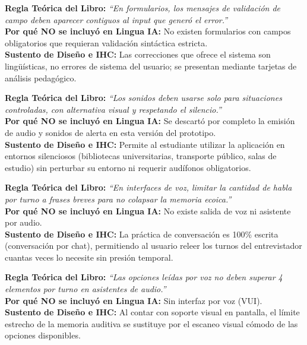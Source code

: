 \documentclass[10pt,a4paper]{article}
\begin{document}
\begin{tcolorbox}[excludedbox, title={C5.2 -- Mostrar los errores junto a su causa \hfill \colorbox{linguaRed}{\scriptsize\textbf{EXCLUIDO}}}]
\small
\textbf{Regla Teórica del Libro:} \textit{``En formularios, los mensajes de validación de campo deben aparecer contiguos al input que generó el error.''}\\
\textbf{Por qué NO se incluyó en Lingua IA:} No existen formularios con campos obligatorios que requieran validación sintáctica estricta.\\
\textbf{Sustento de Diseño e IHC:} Las correcciones que ofrece el sistema son lingüísticas, no errores de sistema del usuario; se presentan mediante tarjetas de análisis pedagógico.
\end{tcolorbox}

\begin{tcolorbox}[excludedbox, title={C5.6 -- Usar sonido con moderación \hfill \colorbox{linguaRed}{\scriptsize\textbf{EXCLUIDO}}}]
\small
\textbf{Regla Teórica del Libro:} \textit{``Los sonidos deben usarse solo para situaciones controladas, con alternativa visual y respetando el silencio.''}\\
\textbf{Por qué NO se incluyó en Lingua IA:} Se descartó por completo la emisión de audio y sonidos de alerta en esta versión del prototipo.\\
\textbf{Sustento de Diseño e IHC:} Permite al estudiante utilizar la aplicación en entornos silenciosos (bibliotecas universitarias, transporte público, salas de estudio) sin perturbar su entorno ni requerir audífonos obligatorios.
\end{tcolorbox}

\begin{tcolorbox}[excludedbox, title={C7.2 -- Mantener la salida de voz breve y segmentada en VUI \hfill \colorbox{linguaRed}{\scriptsize\textbf{EXCLUIDO}}}]
\small
\textbf{Regla Teórica del Libro:} \textit{``En interfaces de voz, limitar la cantidad de habla por turno a frases breves para no colapsar la memoria ecoica.''}\\
\textbf{Por qué NO se incluyó en Lingua IA:} No existe salida de voz ni asistente por audio.\\
\textbf{Sustento de Diseño e IHC:} La práctica de conversación es 100\% escrita (conversación por chat), permitiendo al usuario releer los turnos del entrevistador cuantas veces lo necesite sin presión temporal.
\end{tcolorbox}

\begin{tcolorbox}[excludedbox, title={C7.3 -- Limitar las listas de opciones en VUI \hfill \colorbox{linguaRed}{\scriptsize\textbf{EXCLUIDO}}}]
\small
\textbf{Regla Teórica del Libro:} \textit{``Las opciones leídas por voz no deben superar 4 elementos por turno en asistentes de audio.''}\\
\textbf{Por qué NO se incluyó en Lingua IA:} Sin interfaz por voz (VUI).\\
\textbf{Sustento de Diseño e IHC:} Al contar con soporte visual en pantalla, el límite estrecho de la memoria auditiva se sustituye por el escaneo visual cómodo de las opciones disponibles.
\end{tcolorbox}
\end{document}
